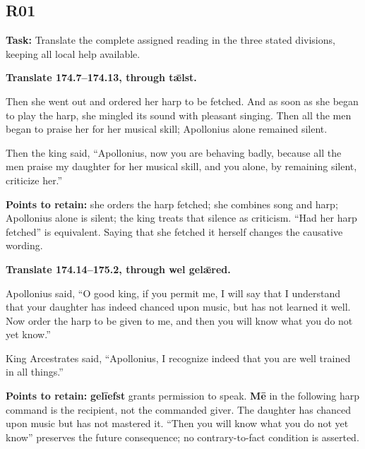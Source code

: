 \subsection*{R01}

\textbf{Task:} Translate the complete assigned reading in the three stated divisions, keeping all local help available.

\textbf{Translate 174.7–174.13, through tǣlst.}

Then she went out and ordered her harp to be fetched. And as soon as she began to play the harp, she mingled its sound with pleasant singing. Then all the men began to praise her for her musical skill; Apollonius alone remained silent.

Then the king said, “Apollonius, now you are behaving badly, because all the men praise my daughter for her musical skill, and you alone, by remaining silent, criticize her.”

\textbf{Points to retain:} she orders the harp fetched; she combines song and harp; Apollonius alone is silent; the king treats that silence as criticism. “Had her harp fetched” is equivalent. Saying that she fetched it herself changes the causative wording.

\textbf{Translate 174.14–175.2, through wel gelǣred.}

Apollonius said, “O good king, if you permit me, I will say that I understand that your daughter has indeed chanced upon music, but has not learned it well. Now order the harp to be given to me, and then you will know what you do not yet know.”

King Arcestrates said, “Apollonius, I recognize indeed that you are well trained in all things.”

\textbf{Points to retain:} \textbf{gelīefst} grants permission to speak. \textbf{Mē} in the following harp command is the recipient, not the commanded giver. The daughter has chanced upon music but has not mastered it. “Then you will know what you do not yet know” preserves the future consequence; no contrary-to-fact condition is asserted.

